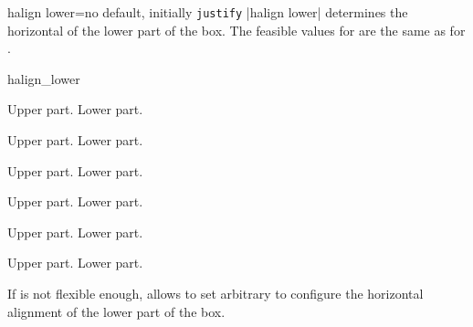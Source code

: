 \begin{docTcbKey}[][doc new=2015-05-07]{halign lower}{=}{no default, initially \texttt{justify}}
  |halign lower| determines the horizontal  of the lower part of the box.
  The feasible values for  are the same as for .

\begin{exdispExample}{halign_lower}
\begin{tcbraster}[raster columns=3,fonttitle=\bfseries,
  colback=red!5!white,colframe=red!75!black]

  \begin{tcolorbox}[adjusted title=flush center,halign lower=flush center]
    Upper part. \tcblower Lower part.
  \end{tcolorbox}
  \begin{tcolorbox}[adjusted title=flush left,halign lower=flush left]
    Upper part. \tcblower Lower part.
  \end{tcolorbox}
  \begin{tcolorbox}[adjusted title=flush right,halign lower=flush right]
    Upper part. \tcblower Lower part.
  \end{tcolorbox}
  \begin{tcolorbox}[adjusted title=center,halign lower=center]
    Upper part. \tcblower Lower part.
  \end{tcolorbox}
  \begin{tcolorbox}[adjusted title=left,halign lower=left]
    Upper part. \tcblower Lower part.
  \end{tcolorbox}
  \begin{tcolorbox}[adjusted title=right,halign lower=right]
    Upper part. \tcblower Lower part.
  \end{tcolorbox}

\end{tcbraster}
\end{exdispExample}
\end{docTcbKey}


\begin{docTcbKeys}[
    doc parameter   = {=\marg{code}},
    doc description = {no default},
    doc new         = 2022-07-07,
    doc name        = halign lower code,
  ]{}
  If  is not flexible enough,
   allows to set
  arbitrary  to configure the horizontal alignment of the lower
  part of the box.
\end{docTcbKeys}


